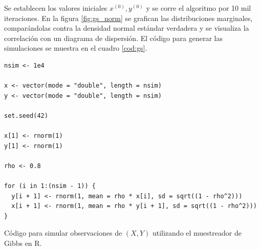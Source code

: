 \documentclass[11pt,a4paper]{article}
\begin{document}
Se establecen los valores iniciales $x^{(0)}, y^{(0)}$ y se corre el algoritmo por 10 mil iteraciones. En la figura \ref{fig:gs_norm} se grafican las distribuciones marginales, comparándolas contra la densidad normal estándar verdadera y se visualiza la correlación con un diagrama de dispersión. El código para generar las simulaciones se muestra en el cuadro \ref{cod:gs}.

\begin{table}[htb]
\begin{lstlisting}
nsim <- 1e4

x <- vector(mode = "double", length = nsim)
y <- vector(mode = "double", length = nsim)

set.seed(42)

x[1] <- rnorm(1)
y[1] <- rnorm(1)

rho <- 0.8

for (i in 1:(nsim - 1)) {
  y[i + 1] <- rnorm(1, mean = rho * x[i], sd = sqrt((1 - rho^2)))
  x[i + 1] <- rnorm(1, mean = rho * y[i + 1], sd = sqrt((1 - rho^2)))
}
\end{lstlisting}
\caption{Código para simular observaciones de $(X, Y)$ utilizando el muestreador de Gibbs en R. }
\label{cod:gs}
\end{table}
\end{document}
